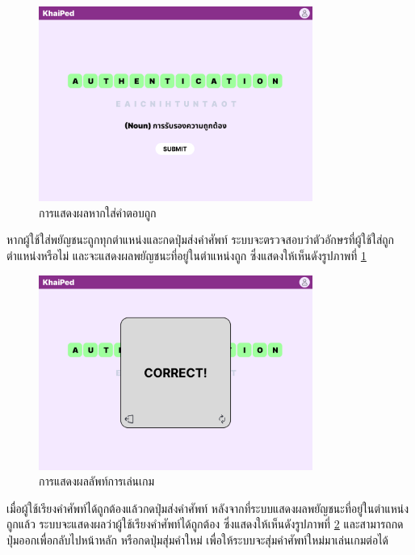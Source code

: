 \documentclass[12pt,oneside,openright,a4paper]{cpe-thai-project}
\begin{document}
\begin{figure}[!h]\centering
	\includegraphics[width=0.8\textwidth, keepaspectratio=true]{image/chap3/ui/game/Word Scramble - Correct Answer.png}
	\caption{การแสดงผลหากใส่คำตอบถูก}\label{fig:UI_GameCorrect}
\end{figure}
\hspace{1cm}
หากผู้ใช้ใส่พยัญชนะถูกทุกตำแหน่งและกดปุ่มส่งคำศัพท์ ระบบจะตรวจสอบว่าตัวอักษรที่ผู้ใช้ใส่ถูกตำแหน่งหรือไม่ และจะแสดงผลพยัญชนะที่อยู่ในตำแหน่งถูก
ซึ่งแสดงให้เห็นดังรูปภาพที่ \ref{fig:UI_GameCorrect}

\pagebreak
\begin{figure}[!h]\centering
	\includegraphics[width=0.8\textwidth, keepaspectratio=true]{image/chap3/ui/game/Word Scramble - Pop Up.png}
	\caption{การแสดงผลลัพท์การเล่นเกม}\label{fig:UI_GameResult}
\end{figure}
\hspace{1cm}
เมื่อผู้ใช้เรียงคำศัพท์ได้ถูกต้องแล้วกดปุ่มส่งคำศัพท์ หลังจากที่ระบบแสดงผลพยัญชนะที่อยู่ในตำแหน่งถูกแล้ว ระบบจะแสดงผลว่าผู้ใช้เรียงคำศัพท์ได้ถูกต้อง
ซึ่งแสดงให้เห็นดังรูปภาพที่ \ref{fig:UI_GameResult}
และสามารถกดปุ่มออกเพื่อกลับไปหน้าหลัก หรือกดปุ่มสุ่มคำใหม่ เพื่อให้ระบบจะสุ่มคำศัพท์ใหม่มาเล่นเกมต่อได้
\end{document}
